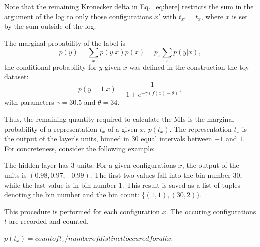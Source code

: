 \documentclass[12pt]{report}
\begin{document}
Note that the remaining Kronecker delta in Eq.~\eqref{eq:here} restricts the sum in the argument of the log to only those configurations $x'$ with $t_{x'}=t_x$, where $x$ is set by the sum outside of the log.


The marginal probability of the label is
\begin{equation}
p(y) = \sum\limits_x p(y|x)p(x) = p_x \sum\limits_x p(y|x),
\end{equation}
the conditional probability for $y$ given $x$ was defined in the construction the toy dataset:
\begin{equation}
p(y=1|x) = \frac{1}{1+e^{-\gamma (f(x)-\theta)}},
\end{equation}
with parameters $\gamma = 30.5$ and $\theta=34$.

Thus, the remaining quantity required to calculate the MIs is the marginal probability of a representation $t_x$ of a given $x$, $p(t_x)$. The representation $t_x$ is the output of the layer's units, binned in 30 equal intervals between $-1$ and $1$. For concreteness, consider the following example:

The hidden layer has 3 units. For a given configurations $x$, the output of the units is $(0.98, 0.97, -0.99)$. The first two values fall into the bin number 30, while the last value is in bin number 1. This result is saved as a list of tuples denoting the bin number and the bin count: $\{(1,1), (30,2)\}$.

This procedure is performed for each configuration $x$. The occuring configurations $t$ are recorded and counted.

$p(t_x) = count of t_x / number of distinct t occured for all x$.
\end{document}
